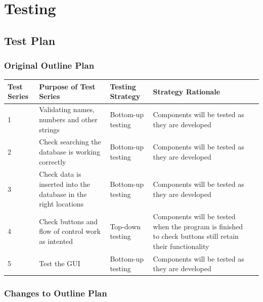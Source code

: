 \chapter{Testing}

\section{Test Plan}

\begin{landscape}
\subsection{Original Outline Plan}

\begin{center}
	\begin{longtable}{|p{2cm}|p{3cm}|p{3cm}|p{3cm}|l}
		\hline
		\textbf{Test Series}   & \textbf{Purpose of Test Series}   & \textbf{Testing Strategy}   & \textbf{Strategy Rationale} \\ \hline
		1  & Validating names, numbers and other strings  & Bottom-up testing  & Components will be tested as they are developed \\ \hline
		2  & Check searching the database is working correctly & Bottom-up testing  & Components will be tested as they are developed \\ \hline
		3  & Check data is inserted into the database in the right locations & Bottom-up testing  & Components will be tested as they are developed \\ \hline
		4  & Check buttons and flow of control work as intented & Top-down testing  & Components will be tested when the program is finished to check buttons still retain their functionality \\ \hline
		5  & Test the GUI & Bottom-up testing  & Components will be tested as they are developed \\ \hline
	\end{longtable}
\end{center}

\subsection{Changes to Outline Plan}


\end{landscape}
